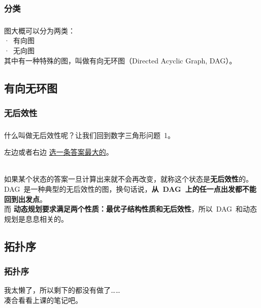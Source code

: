 \documentclass[UTF8]{beamer}
\begin{document}
	\subsubsection{分类}
	\begin{frame}
		\frametitle{\insertsubsubsection}
		图大概可以分为两类：
		\\
		\qquad ·~有向图
		\\
		\qquad ·~无向图
		\\\pause
		\vspace{5mm}
		其中有一种特殊的图，叫做有向无环图（Directed Acyclic Graph, DAG）。
	\end{frame}

	\subsection{有向无环图}
	\subsubsection{无后效性}
	\begin{frame}
		\frametitle{\insertsubsubsection}
		什么叫做无后效性呢？让我们回到数字三角形问题~1。
		\begin{center}
			\Large {左边或者右边 \underline{选一条答案最大的}。}
		\end{center}
		\ \\
		如果某个状态的答案一旦计算出来就不会再改变，就称这个状态是\textbf{无后效性}的。
		\\\pause
		DAG~是一种典型的无后效性的图，换句话说，\textbf{从~DAG~上的任一点出发都不能回到出发点}。
		\\\pause
		而 \textbf{动态规划要求满足两个性质：最优子结构性质和无后效性}，所以~DAG~和动态规划是息息相关的。
	\end{frame}

	\subsection{拓扑序}
	\subsubsection{拓扑序}
	\begin{frame}
		我太懒了，所以剩下的都没有做了……
		\\
		凑合看看上课的笔记吧。
	\end{frame}
\end{document}

